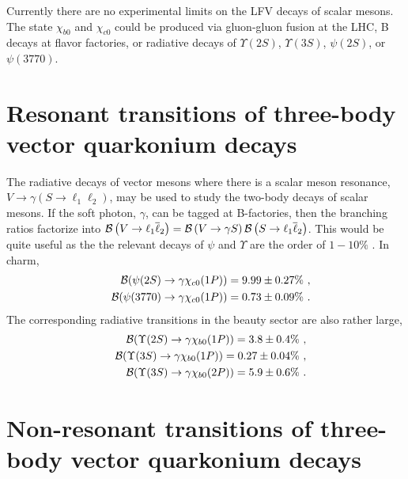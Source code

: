 \documentclass[12pt]{article}
\begin{document}
Currently there are no experimental limits on the LFV decays of scalar mesons.  The state $\chi_{b0}$ and $\chi_{c0}$ could be produced via gluon-gluon fusion at the LHC, B decays at flavor factories, or radiative decays of $\Upsilon(2S)$, $\Upsilon(3S)$, $\psi(2S)$, or $\psi(3770)$.

\section{Resonant transitions of three-body vector quarkonium decays}

The radiative decays of vector mesons where there is a scalar meson resonance, $V \to \gamma \left(S \to \ell_1 \ell_2 \right)$, may be used to study the two-body decays of scalar mesons.  If the soft photon, $\gamma$, can be tagged at B-factories, then the branching ratios factorize into ${\cal B}\left(V \to \ell_1 \overline{\ell}_2 \right) = {\cal B}\left(V \to \gamma S \right) {\cal B}\left(S \to \ell_1 \overline{\ell}_2 \right)$.  This would be quite useful as the the relevant decays of $\psi$ and $\Upsilon$ are the order of $1-10 \%$ \cite{PDG}. In charm,
%
\begin{eqnarray}\label{BranchRadc}
&&  {\cal B}(\psi(2S) \to \gamma \chi_{c0} (1P)) = 9.99 \pm 0.27\% \ ,
\nonumber \\
&& {\cal B}(\psi(3770) \to \gamma \chi_{c0}(1P)) = 0.73 \pm 0.09\% \ .
\nonumber 
\end{eqnarray}
% 
The corresponding radiative transitions in the beauty sector are also rather large,
%
\begin{eqnarray}\label{BranchRadb}
&& {\cal B}(\Upsilon(2S) \to \gamma \chi_{b0}(1P)) = 3.8 \pm 0.4\% \ ,
\nonumber \\
&& {\cal B}(\Upsilon(3S) \to \gamma \chi_{b0}(1P)) = 0.27 \pm 0.04\% \ ,
\\
&&  {\cal B}(\Upsilon(3S) \to \gamma \chi_{b0} (2P)) = 5.9 \pm 0.6\% \ .
\nonumber 
\end{eqnarray}


\section{Non-resonant transitions of three-body vector quarkonium decays}
\end{document}
